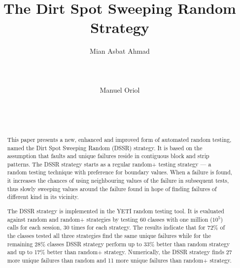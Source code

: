 \documentclass{acm_proc_article-sp}
\begin{document}
\title{The Dirt Spot Sweeping Random Strategy}


%
\author{
%
%
\alignauthor
Mian Asbat Ahmad\\
       \\
       \\
       \\
\alignauthor
Manuel Oriol \\
       \\
       \\
       \\
}



\maketitle
\begin{abstract}
This paper presents a new, enhanced and improved form of automated random testing, named the Dirt Spot Sweeping Random (DSSR) strategy. It is based on the assumption that faults and unique failures reside in contiguous block and strip patterns. The DSSR strategy starts as a regular random+ testing strategy --- a random testing technique with preference for boundary values. When a failure is found, it increases the chances of using neighbouring values of the failure in subsequent tests, thus slowly sweeping values around the failure found in hope of finding failures of different kind in its vicinity.

The DSSR strategy is implemented in the YETI random testing tool. It is evaluated against random and random+ strategies by testing 60 classes with one million ($10^5$) calls for each session, 30 times for each strategy.
The results indicate that for 72\% of the classes tested all three strategies find the same unique failures while for the remaining 28\% classes DSSR strategy perform up to 33\% better than random strategy and up to 17\% better than random+ strategy. Numerically, the DSSR strategy finds 27 more unique failures than random and 11 more unique failures than random+ strategy.
\end{abstract}
\end{document}
